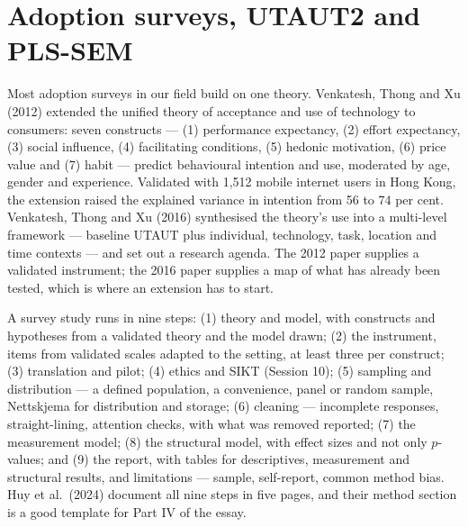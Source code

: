 \documentclass[11pt,a4paper,british,twoside=false,headings=small,chapterprefix=false,numbers=noenddot]{scrbook}
\begin{document}
\section{Adoption surveys, UTAUT2 and PLS-SEM}

Most adoption surveys in our field build on one theory. Venkatesh, Thong and Xu (2012) extended the unified theory of acceptance and use of technology to consumers: seven constructs --- (1) performance expectancy, (2) effort expectancy, (3) social influence, (4) facilitating conditions, (5) hedonic motivation, (6) price value and (7) habit --- predict behavioural intention and use, moderated by age, gender and experience. Validated with 1,512 mobile internet users in Hong Kong, the extension raised the explained variance in intention from 56 to 74 per cent. Venkatesh, Thong and Xu (2016) synthesised the theory's use into a multi-level framework --- baseline UTAUT plus individual, technology, task, location and time contexts --- and set out a research agenda. The 2012 paper supplies a validated instrument; the 2016 paper supplies a map of what has already been tested, which is where an extension has to start.

A survey study runs in nine steps: (1) theory and model, with constructs and hypotheses from a validated theory and the model drawn; (2) the instrument, items from validated scales adapted to the setting, at least three per construct; (3) translation and pilot; (4) ethics and SIKT (Session 10); (5) sampling and distribution --- a defined population, a convenience, panel or random sample, Nettskjema for distribution and storage; (6) cleaning --- incomplete responses, straight-lining, attention checks, with what was removed reported; (7) the measurement model; (8) the structural model, with effect sizes and not only $p$-values; and (9) the report, with tables for descriptives, measurement and structural results, and limitations --- sample, self-report, common method bias. Huy et al.\ (2024) document all nine steps in five pages, and their method section is a good template for Part IV of the essay.
\end{document}
